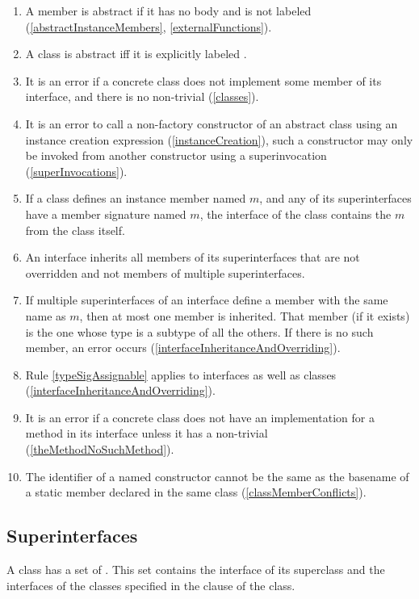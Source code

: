 \documentclass[makeidx]{article}
\begin{document}
{\begin{enumerate}
  Interfaces have their own inheritance rules
  (\ref{interfaceInheritanceAndOverriding}).
\item A member is abstract if
  it has no body and is not labeled \EXTERNAL{}
  (\ref{abstractInstanceMembers}, \ref{externalFunctions}).
\item A class is abstract if{}f it is explicitly labeled \ABSTRACT.
\item It is an error if a concrete class does not implement some member
  of its interface, and there is no non-trivial 
  (\ref{classes}).
\item It is an error to call a non-factory constructor of an abstract class
  using an instance creation expression (\ref{instanceCreation}),
  such a constructor may only be invoked from another constructor
  using a superinvocation (\ref{superInvocations}).
\item If a class defines an instance member named $m$,
  and any of its superinterfaces have a member signature named $m$,
  the interface of the class contains the $m$ from the class itself.
\item An interface inherits all members of its superinterfaces
  that are not overridden and not members of multiple superinterfaces.
\item If multiple superinterfaces of an interface
  define a member with the same name as $m$,
  then at most one member is inherited.
  That member (if it exists) is the one whose type is a subtype
  of all the others.
  If there is no such member, an error occurs
  (\ref{interfaceInheritanceAndOverriding}).
\item Rule \ref{typeSigAssignable} applies to interfaces as well as classes
  (\ref{interfaceInheritanceAndOverriding}).
\item It is an error if a concrete class does not have an implementation
  for a method in its interface
  unless it has a non-trivial 
  (\ref{theMethodNoSuchMethod}).
\item The identifier of a named constructor cannot be the same as
  the basename of a static member declared in the same class
  (\ref{classMemberConflicts}).
\end{enumerate}%
}


\subsection{Superinterfaces}

\LMHash{}%
A class has a set of .
This set contains the interface of its superclass
and the interfaces of the classes specified in
the \IMPLEMENTS{} clause of the class.
\end{document}

